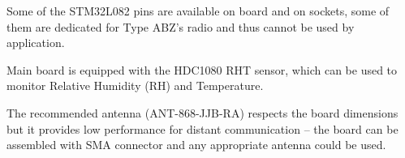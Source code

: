   Some of the STM32L082 pins are available on board and on sockets, some of them are dedicated for Type ABZ's radio and thus cannot be used by application.
  
  Main board is equipped with the HDC1080 RHT sensor, which can be used to monitor Relative Humidity (RH) and Temperature.
  
  The recommended antenna (ANT-868-JJB-RA) respects the board dimensions but it provides low performance for distant communication -- the board can be assembled with SMA connector and any appropriate antenna could be used.
  
  
  \newpage
  
